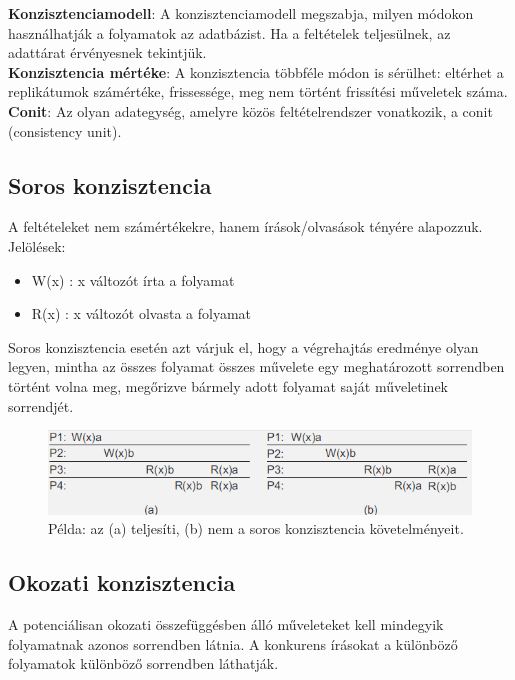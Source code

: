 \documentclass[margin=0px]{article}
\begin{document}
	\noindent \textbf{Konzisztenciamodell}: A konzisztenciamodell megszabja, milyen módokon használhatják a folyamatok
	az adatbázist. Ha a feltételek teljesülnek, az adattárat érvényesnek tekintjük.\\
	
	\noindent \textbf{Konzisztencia mértéke}: A konzisztencia többféle módon is sérülhet: eltérhet a replikátumok
	számértéke, frissessége, meg nem történt frissítési műveletek száma.\\
	
	\noindent \textbf{Conit}: Az olyan adategység, amelyre közös feltételrendszer vonatkozik, a conit (consistency unit).
	
	\subsection{Soros konzisztencia}
	
	A feltételeket nem számértékekre, hanem írások/olvasások tényére alapozzuk.
	Jelölések:
	\begin{itemize}
		\item	W(x) : x változót írta a folyamat
		\item	R(x) : x változót olvasta a folyamat
	\end{itemize}
	
	Soros konzisztencia esetén azt várjuk el, hogy a végrehajtás eredménye olyan legyen, mintha az összes folyamat
	összes művelete egy meghatározott sorrendben történt volna meg, megőrizve bármely adott folyamat saját műveletinek
	sorrendjét. 

	\begin{figure}[H]
		\centering
		\includegraphics[width=0.7\linewidth]{img/konz_soros}
		\caption{Példa: az (a) teljesíti, (b) nem a soros konzisztencia követelményeit.}
		\label{fig:konz_soros}
	\end{figure}
	
	\subsection{Okozati konzisztencia}
	
	A potenciálisan okozati összefüggésben álló műveleteket kell mindegyik folyamatnak azonos sorrendben látnia.
	A konkurens írásokat a különböző folyamatok különböző sorrendben láthatják.
	
\end{document}

